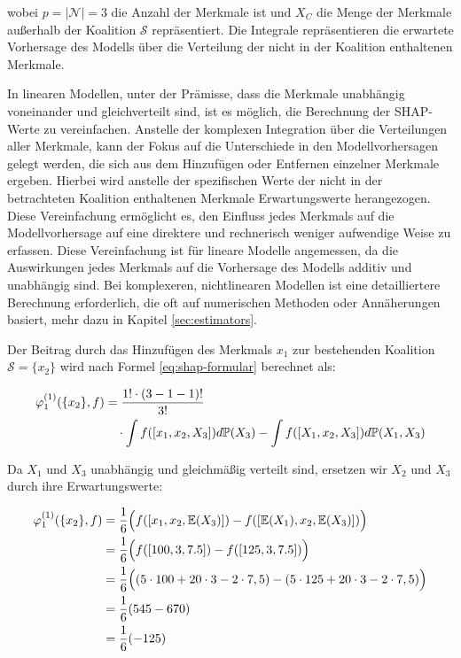 wobei $p = |\mathcal{N}| = 3$ die Anzahl der Merkmale ist und $X_C$ die Menge der Merkmale 
außerhalb der Koalition $\mathcal{S}$ repräsentiert. Die Integrale repräsentieren die erwartete 
Vorhersage des Modells über die Verteilung der nicht in der Koalition enthaltenen Merkmale.

In linearen Modellen, unter der Prämisse, dass die Merkmale unabhängig voneinander und gleichverteilt sind, 
ist es möglich, die Berechnung der SHAP-Werte zu vereinfachen. Anstelle der komplexen Integration 
über die Verteilungen aller Merkmale, kann der Fokus auf die Unterschiede in den Modellvorhersagen gelegt werden, 
die sich aus dem Hinzufügen oder Entfernen einzelner Merkmale ergeben. 
Hierbei wird anstelle der spezifischen Werte der nicht in der betrachteten Koalition enthaltenen Merkmale 
Erwartungswerte herangezogen. Diese Vereinfachung ermöglicht es, den Einfluss jedes Merkmals auf 
die Modellvorhersage auf eine direktere und rechnerisch weniger aufwendige Weise zu erfassen.
Diese Vereinfachung ist für lineare Modelle angemessen, da die Auswirkungen jedes Merkmals 
auf die Vorhersage des Modells additiv und unabhängig sind. Bei komplexeren, 
nichtlinearen Modellen ist eine detailliertere Berechnung erforderlich, 
die oft auf numerischen Methoden oder Annäherungen basiert, mehr dazu in Kapitel \ref{sec:estimators}.

Der Beitrag durch das Hinzufügen des Merkmals $x_1$ zur bestehenden Koalition $\mathcal{S} = \{x_2\}$ wird
nach Formel \ref{eq:shap-formular} berechnet als:

\begin{align}
    \varphi^{(1)}_{1}(\{x_2\}, f) &= \frac{1! \cdot (3 - 1 - 1)!}{3!} \\ \notag
        &\quad \cdot \int f([x_1, x_2 , X_3]) d\mathbb{P}(X_3) - \int f([X_1, x_2, X_3]) d\mathbb{P}(X_1, X_3)
\end{align}

Da \( X_1 \) und \( X_3 \) unabhängig und gleichmäßig verteilt sind, ersetzen wir \( X_2 \) und \( X_3 \) durch ihre Erwartungswerte:

\begin{align}
    \varphi^{(1)}_{1}(\{x_2\}, f) &= \frac{1}{6} \Big(f([x_1, x_2, \mathbb{E}(X_3)]) - f([\mathbb{E}(X_1), x_2, \mathbb{E}(X_3)])\Big) \\ \notag
        &= \frac{1}{6} \Big( f([100, 3, 7.5]) - f([125, 3, 7.5]) \Big) \\ \notag
        &= \frac{1}{6} \Big( (5 \cdot 100 + 20 \cdot 3 - 2 \cdot 7,5) - (5 \cdot 125 + 20 \cdot 3 - 2 \cdot 7,5) \Big) \\ \notag
        &= \frac{1}{6} (545 - 670) \\ \notag
        &= \frac{1}{6} (-125)
\end{align}
 
